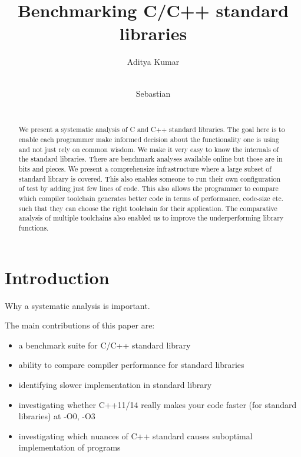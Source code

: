 \documentclass{sig-alternate}
\begin{document}
\def \GCC {GCC}
\def \LLVM {LLVM}

\setlength{\pdfpageheight}{\paperheight}
\setlength{\pdfpagewidth}{\paperwidth}

\title{Benchmarking C/C++ standard libraries}


\author{
\alignauthor
Aditya Kumar\\
       \\
\and
\alignauthor
Sebastian\\
       \\
}

\maketitle
\begin{abstract}
We present a systematic analysis of C and C++ standard libraries. The goal here
is to enable each programmer make informed decision about the functionality one
is using and not just rely on common wisdom. We make it very easy to know the
internals of the standard libraries. There are benchmark analyses available
online but those are in bits and pieces. We present a comprehensize
infrastructure where a large subset of standard library is covered. This also
enables someone to run their own configuration of test by adding just few lines
of code. This also allows the programmer to compare which compiler toolchain
generates better code in terms of performance, code-size etc. such that they can
choose the right toolchain for their application. The comparative analysis of
multiple toolchains also enabled us to improve the underperforming library
functions.
\end{abstract}

\section{Introduction}
Why a systematic analysis is important.

The main contributions of this paper are:
\begin{itemize}
\item a benchmark suite for C/C++ standard library
\item ability to compare compiler performance for standard libraries
\item identifying slower implementation in standard library
\item investigating whether C++11/14 really makes your code faster (for
standard libraries) at -O0, -O3
\item investigating which nuances of C++ standard causes suboptimal
implementation of programs
\end{itemize}
\end{document}
